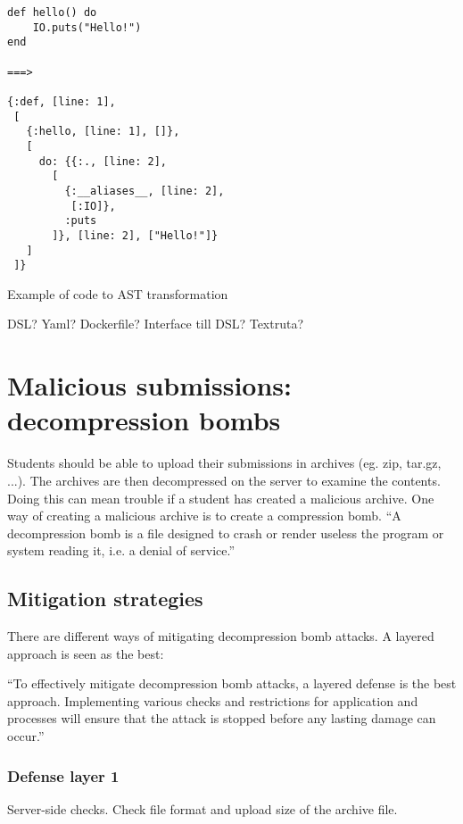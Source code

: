 \label{ast_listing}
\begin{listing}
\begin{verbatim}
def hello() do
    IO.puts("Hello!")
end

===>

{:def, [line: 1],
 [
   {:hello, [line: 1], []},
   [
     do: {{:., [line: 2],
       [
         {:__aliases__, [line: 2],
          [:IO]},
         :puts
       ]}, [line: 2], ["Hello!"]}
   ]
 ]}
\end{verbatim}
\caption{Example of code to AST transformation}
\label{ast_listing}
\end{listing}

DSL? Yaml? Dockerfile?
Interface till DSL? Textruta?



\section{Malicious submissions: decompression bombs}

Students should be able to upload their submissions in archives (eg. zip, tar.gz, ...). The archives are then decompressed on the server to examine the contents. Doing this can mean trouble if a student has created a malicious archive. One way of creating a malicious archive is to create a compression bomb. ``A decompression bomb is a file designed to crash or render useless the program or system reading it, i.e. a denial of service.''~\cite{Bomb.codes}

\subsection*{Mitigation strategies}

There are different ways of mitigating decompression bomb attacks. A layered approach is seen as the best:

``To effectively mitigate decompression bomb attacks, a layered defense is the best approach. Implementing various checks and restrictions for application and processes will ensure that the attack is stopped before any lasting damage can occur.''~\cite{Bomb.codes}

\subsubsection*{Defense layer 1}

Server-side checks. Check file format and upload size of the archive file.

